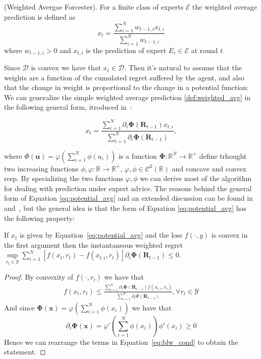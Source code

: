 \begin{definition}(Weighted Avergae Forcester).\label{def:weighted_avg}
For a finite class of experts $\mathcal E$ the weighted average prediction is defined as
\begin{equation}
	x_t = \frac{\sum\limits_{i=1}^{N}w_{t-1,i}x_{t,i}}{\sum\limits_{i=1}^{N}w_{t-1,i}}
\end{equation}
where $w_{t-1,i}>0$ and $x_{t,i}$ is the prediction of expert $E_i\in\mathcal E$ at round $t$. 
\end{definition}

Since $\mathcal D$ is convex we have that $x_t\in\mathcal D$.
Then it's natural to assume that the weights are a function of the cumulated regret suffered by the agent, and also that the change in weight is proportional to the change in a potential function:
We can generalize the simple weighted average prediction \eqref{def:weighted_avg} in the following general form, itroduced in~\cite{cesa2003potential}:

\begin{equation}\label{eq:potential_avg}
	x_t = \frac{\sum\limits_{i=1}^{N}\partial_i \mathbf \Phi(\mathbf R_{t-1}) x_{t,i}}{\sum\limits_{i=1}^{N}\partial_i \mathbf \Phi(\mathbf R_{t-1}) },
\end{equation}

where $\Phi(\mathbf u)=\varphi\left(\sum\limits_{i=1}^N\phi(u_i)\right)$ is a function $\mathbf \Phi:\mathbb R^N\to\mathbb R^+$ define trhought two increasing functions $\phi,\varphi:\mathbb R\to\mathbb R^+$, $\varphi,\phi\in\mathcal C^2(\mathbb R)$ and concave and convex resp.
By specializing the two functions $\varphi,\phi$ we can derive most of the algorithm for dealing with prediction under expert advice.
The reasons behind the general form of Equation \eqref{eq:potential_avg} and an extended discussion can be found in~\cite{hart2001general} and~\cite{blackwell1956analog}, but the general idea is that the form of Equation \eqref{eq:potential_avg} has the following property:

\begin{theorem}
	If $x_t$ is given by Equation~\eqref{eq:potential_avg} and the loss $f(\cdot,y)$ is convex in the first argument then the instantaneous weighted regret $\sup\limits_{r_t\in\mathcal Y}\sum\limits_{i=1}^N[f(x_t,r_t)-f(x_{t,i},r_t)]\partial_i \mathbf \Phi(\mathbf R_{t-1}) \le 0$.
\end{theorem}

\begin{proof}
	By convexity of $f(\cdot,r_t)$ we have that 
\begin{align}
	f(x_t,r_t)\le\frac{\sum\limits_{i=1}^N\partial_i\mathbf \Phi(\mathbf R_{t-1})f(x_{t,i},r_t)}{\sum\limits_{i=1}^N\partial_i\Phi(\mathbf R_{t-1})}, \forall r_t\in\mathcal Y\label{eq:blw_cond}
\end{align}
And since $\mathbf \Phi(\mathbf x)=\varphi\left(\sum\limits_{i=1}^N \phi(x_i)\right)$ we have that $$\partial_i\mathbf \Phi(\mathbf x)=\varphi'\left(\sum\limits_{i=1}^N\phi(x_i)\right)\phi'(x_i)\ge0$$
Hence we can rearrange the terms in Equation~\eqref{eq:blw_cond} to obtain the statement.
\end{proof}

